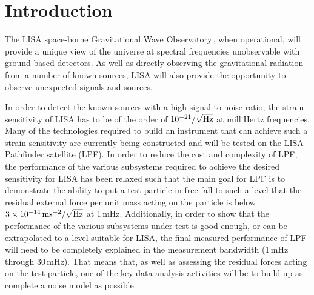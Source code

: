 \section{Introduction}

The LISA space-borne Gravitational Wave Observatory\,\cite{Bender00}, when operational,
will provide a unique view of the universe at spectral frequencies unobservable
with ground based detectors. As well as directly observing the gravitational radiation from a
number of known sources, LISA will also provide the opportunity to observe unexpected
signals and sources.

In order to detect the known sources with a high signal-to-noise ratio, the strain
sensitivity of LISA has to be of the order of $10^{-21}/\sqrt{\rm Hz}$ at milliHertz
frequencies. Many of the technologies required to build an instrument that
can achieve such a strain sensitivity are currently being constructed and will
be tested on the LISA Pathfinder satellite (LPF). In order to reduce the cost and
complexity of LPF, the performance of the various subsystems required to achieve
the desired sensitivity for LISA has been relaxed such that the main goal for LPF
is to demonstrate the ability to put a test particle in free-fall to such a level
that the residual external force per unit mass acting on the particle is below
$3\times10^{-14}\,{\rm m s^{-2}}/\sqrt{\rm Hz}$ at 1\,mHz. Additionally,
in order to show that the performance of the various subsystems under test is good
enough, or can be extrapolated to a level suitable for LISA, the final measured
performance of LPF will need to be completely explained in the measurement bandwidth
(1\,mHz through 30\,mHz). That means that, as well as assessing the residual
forces acting on the test particle, one of the key data analysis activities
will be to build up as complete a noise model as possible.

